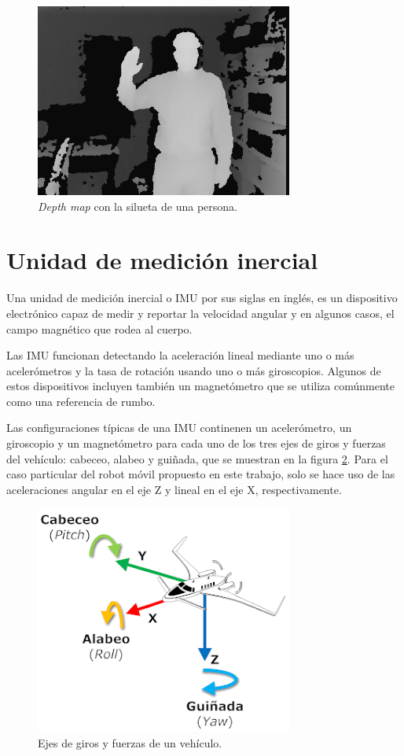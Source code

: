 \begin{figure}[ht]
    \centering
    \includegraphics[scale=2.5]{./Figures/depth_map.png}
    \caption{\textit{Depth map} con la silueta de una persona\protect\footnotemark.}
    \label{fig:depthMap}
\end{figure}


\section{Unidad de medición inercial}

Una unidad de medición inercial o IMU por sus siglas en inglés, es un dispositivo electrónico capaz de medir y reportar la velocidad angular y en algunos casos, el campo magnético que rodea al cuerpo.

Las IMU funcionan detectando la aceleración lineal mediante uno o más acelerómetros y la tasa de rotación usando uno o más giroscopios. Algunos de estos dispositivos incluyen también un magnetómetro que se utiliza comúnmente como una referencia de rumbo.

Las configuraciones típicas de una IMU continenen un acelerómetro, un giroscopio y un magnetómetro para cada uno de los tres ejes de giros y fuerzas del vehículo: cabeceo, alabeo y guiñada, que se muestran en la figura \ref{fig:girosYFuerzas}. Para el caso particular del robot móvil propuesto en este trabajo, solo se hace uso de las aceleraciones angular en el eje Z y lineal en el eje X, respectivamente.

\begin{figure}[ht]
    \centering
    \includegraphics[scale=2.0]{./Figures/imu.png}
    \caption{Ejes de giros y fuerzas de un vehículo\protect\footnotemark.}
    \label{fig:girosYFuerzas}
\end{figure}

